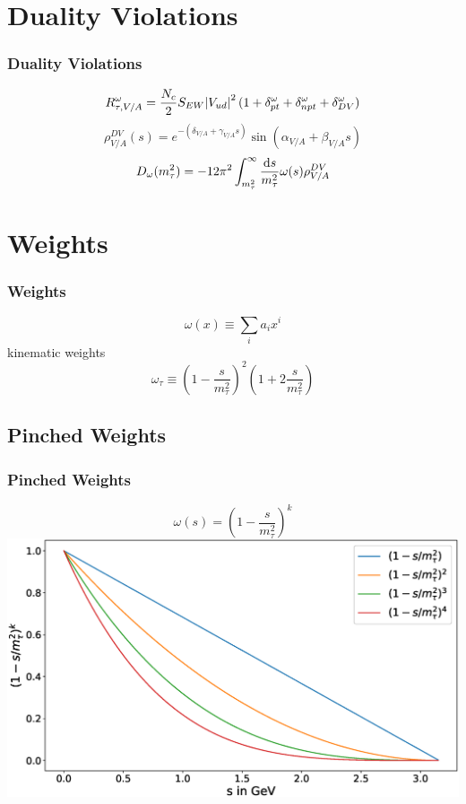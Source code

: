 \documentclass{beamer}
\begin{document}
\section{Duality Violations}
\begin{frame}
  \frametitle{Duality Violations}
  \begin{equation}
    R_{\tau,V/A}^\omega = \frac{N_c}{2} S_{EW} \abs{V_{ud}}^2 (1 + \delta_{pt}^\omega + \delta_{npt}^\omega + \delta_{DV}^\omega)
  \end{equation}
  \begin{equation}
    \rho_{V/A}^{DV}(s) = e^{-(\delta_{V/A} + \gamma_{V/A}s)} \sin(\alpha_{V/A} + \beta_{V/A}s)
  \end{equation}
  \begin{equation}
    D_\omega(m_\tau^2) = -12 \pi^2 \int_{m_\tau^2}^\infty \frac{\dif s}{m_\tau^2} \omega(s) \rho_{V/A}^{DV}
  \end{equation}
\end{frame}

\section{Weights}
\begin{frame}
  \frametitle{Weights}
  \begin{equation}
    \omega(x) \equiv \sum_i a_i x^i
  \end{equation}
  kinematic weights
  \begin{equation}
    \omega_\tau \equiv (1 - \frac{s}{m_\tau^2})^2(1 + 2 \frac{s}{m_\tau^2})
  \end{equation}
\end{frame}

\subsection{Pinched Weights}
\begin{frame}
  \frametitle{Pinched Weights}
  \begin{equation}
    \omega(s) = \left( 1 - \frac{s}{m_\tau^2} \right)^k
  \end{equation}
  \includegraphics[width=\textwidth]{./images/monomialWeightGraphs.eps}
\end{frame}
\end{document}

